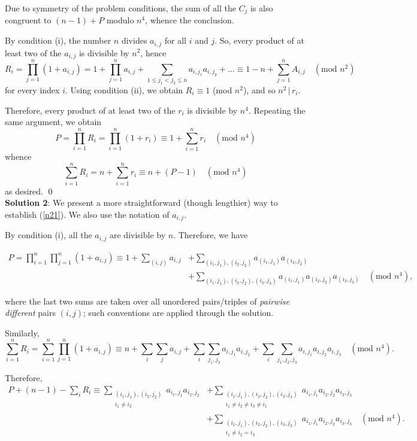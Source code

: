 \documentclass[a4paper, 12pt]{article}
\begin{document}
\begin{enumerate}
Due to symmetry of the problem conditions, the sum of all the $C_j$ is also congruent to $(n-1) + P$ modulo $n^4$, whence the conclusion.

By condition (i), the number $n$ divides $a_{i, j}$ for all $i$ and $j$. So, every product of at least two of the $a_{i,j}$ is divisible by $n^2$, hence
\begin{equation*}
    R_i = \prod_{j=1}^n (1 + a_{i,j}) = 1 + \prod_{j=1}^n a_{i,j} + \sum_{1 \leq j_1 < j_2 \leq n} a_{i, j_1} a_{i, j_2} + \dots \equiv 1 - n + \sum_{j=1}^n A_{i,j} \quad (\textrm{mod } n^2)
\end{equation*}
for every index $i$. Using condition (ii), we obtain $R_i \equiv 1$ (mod $n^2$), and so $n^2 \,|\, r_i$.

Therefore, every product of at least two of the $r_i$ is divisible by $n^4$. Repeating the same argument, we obtain
$$
P = \prod_{i=1}^n R_i = \prod_{i=1}^n (1 + r_i) \equiv 1 + \sum_{i=1}^n r_i \quad (\textrm{mod } n^4)
$$
whence
$$
\sum_{i=1}^n R_i = n + \sum_{i=1}^n r_i \equiv n + (P-1) \quad (\textrm{mod } n^4)
$$
as desired. \qed \\

\textbf{Solution 2}:  We present a more straightforward (though lengthier) way to establish (\ref{n21}). We also use the notation of $a_{i, j}$.

By condition (i), all the $a_{i, j}$ are divisible by $n$. Therefore, we have

\begin{align*}
    P = \prod_{i=1}^n \prod_{j=1}^n (1 + a_{i, j} ) \equiv 1 + \sum_{(i, j)} a_{i, j} &+ \sum_{(i_1, j_1), (i_2, j_2)} a_{(i_1, j_1)} a_{(i_2, j_2)}  \\
    &+ \sum_{(i_1, j_1), (i_2, j_2), (i_3, j_3)} a_{(i_1, j_1)} a_{(i_2, j_2)} a_{(i_3, j_3)} \quad (\textrm{mod } n^4 ),
\end{align*}

where the last two sums are taken over all unordered pairs/triples of \textit{pairwise different} pairs $(i, j)$; such conventions are applied through the solution.

Similarly,
$$
\sum_{i=1}^n R_i = \sum_{i=1}^n \prod_{j=1}^n (1 + a_{i, j}) \equiv n + \sum_i \sum_j a_{i, j} + \sum_i \sum_{j_1, j_2} a_{i, j_1} a_{i, j_2} + \sum_i \sum_{j_1, j_2, j_3} a_{i, j_1} a_{i, j_2} a_{i, j_3} \quad (\textrm{mod } n^4).
$$

Therefore,
\begin{align*}
    P + (n-1) - \sum_i R_i \equiv \sum_{\substack{(i_1, j_1), (i_2, j_2) \\ i_1 \not = i_2 }} a_{i_1, j_1} a_{i_2, j_2} &+ \sum_{\substack{(i_1, j_1), (i_2, j_2), (i_3, j_3) \\ i_1 \not = i_2 \not = i_3 \not = i_1 }} a_{i_1, j_1} a_{i_2, j_2} a_{i_3, j_3} \\
    &+ \sum_{\substack{(i_1, j_1), (i_2, j_2), (i_3, j_3) \\ i_1 \not = i_2  = i_3 }} a_{i_1, j_1} a_{i_2, j_2} a_{i_3, j_3} \quad (\textrm{mod } n^4).
\end{align*}


\end{enumerate}
\end{document}
